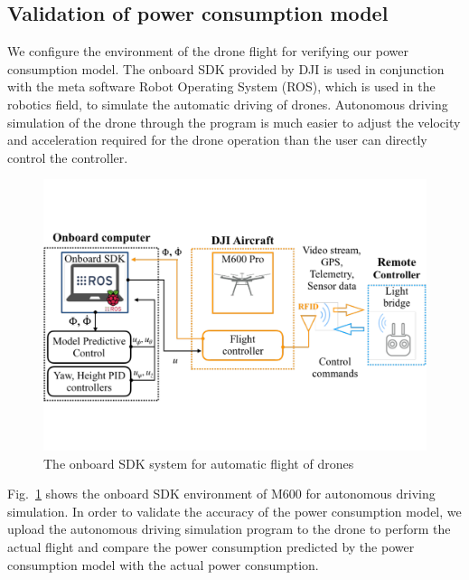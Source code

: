 \documentclass[journal]{./template/IEEEtran}
\begin{document}
\label{Section: Deep Neural networks (DNN)}





\subsection{Validation of power consumption model}

We configure the environment of the drone flight for verifying our power consumption model. 
The onboard SDK provided by DJI is used in conjunction with the meta software Robot Operating System (ROS), which is used in the robotics field, to simulate the automatic driving of drones. 
Autonomous driving simulation of the drone through the program is much easier to adjust the velocity and acceleration required for the drone operation than the user can directly control the controller. 

\begin{figure}[htbp]
\centering\includegraphics[scale=0.285]{fig7/SDK.pdf}
\caption{The onboard SDK system for automatic flight of drones}
\label{fig:SDK}
\end{figure}

Fig.~\ref{fig:SDK} shows the onboard SDK environment of M600 for autonomous driving simulation.
In order to validate the accuracy of the power consumption model, we upload the autonomous driving simulation program to the drone to perform the actual flight and compare the power consumption predicted by the power consumption model with the actual power consumption. 
\end{document}
